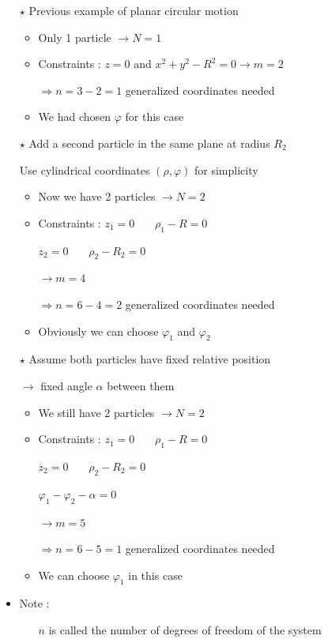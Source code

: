 \Tr
\begin{itemize}
\item[$\star$] Previous example of planar circular motion
\begin{itemize}
\item Only 1 particle $\rightarrow N=1$
\item Constraints : $z=0$ and $x^{2}+y^{2}-R^{2}=0 \rightarrow m=2$
\item[] $\Rightarrow n=3-2=1$ generalized coordinates needed
\item We had chosen $\varphi$ for this case
\end{itemize}
\item[$\star$] Add a second particle in the same plane at radius $R_{2}$
\item[] Use cylindrical coordinates $(\rho,\varphi)$ for simplicity
\begin{itemize}
\item Now we have 2 particles $\rightarrow N=2$
\item Constraints :    $z_{1}=0$ ~~~$\rho_{1}-R=0$
\item[] \hspace{43mm}  $z_{2}=0$ ~~~$\rho_{2}-R_{2}=0$
\item[] $\rightarrow m=4$
\item[] $\Rightarrow n=6-4=2$ generalized coordinates needed
\item Obviously we can choose $\varphi_{1}$ and $\varphi_{2}$
\end{itemize}
\end{itemize}

\Tr
\begin{itemize}
\item[$\star$] Assume both particles have fixed relative position
\item[] $\rightarrow$ fixed angle $\alpha$ between them
\begin{itemize}
\item We still have 2 particles $\rightarrow N=2$
\item Constraints :    $z_{1}=0$ ~~~$\rho_{1}-R=0$
\item[] \hspace{43mm}   $z_{2}=0$ ~~~$\rho_{2}-R_{2}=0$
\item[] \hspace{43mm}   $\varphi_{1}-\varphi_{2}-\alpha=0$
\item[] $\rightarrow m=5$
\item[] $\Rightarrow n=6-5=1$ generalized coordinates needed
\item We can choose $\varphi_{1}$ in this case
\end{itemize}
\item Note :
\begin{itemize}
\item[] {\blue $n$} is called the {\blue number of degrees of freedom} of the
        system
\end{itemize}
\end{itemize}

